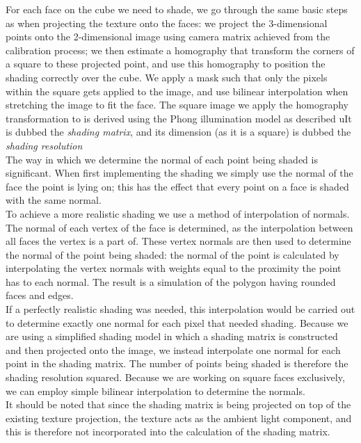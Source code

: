 For each face on the cube we need to shade, we go through the same basic steps as when projecting the texture onto the faces: we project the 3-dimensional points onto the 2-dimensional image using camera matrix achieved from the calibration process; we then estimate a homography that transform the corners of a square to these projected point, and use this homography to position the shading correctly over the cube. We apply a mask such that only the pixels within the square gets applied to the image, and use bilinear interpolation when stretching the image to fit the face. The square image we apply the homography transformation to is derived using the Phong illumination model as described uIt is dubbed the \textsl{shading matrix}, and its dimension (as it is a square) is dubbed the \textsl{shading resolution}\\
The way in which we determine the normal of each point being shaded is significant. When first implementing the shading we simply use the normal of the face the point is lying on; this has the effect that every point on a face is shaded with the same normal.\\
To achieve a more realistic shading we use a method of interpolation of normals. The normal of each vertex of the face is determined, as the interpolation between all faces the vertex is a part of. These vertex normals are then used to determine the normal of the point being shaded: the normal of the point is calculated by interpolating the vertex normals with weights equal to the proximity the point has to each normal. The result is a simulation of the polygon having rounded faces and edges.\\
If a perfectly realistic shading was needed, this interpolation would be carried out to determine exactly one normal for each pixel that needed shading. Because we are using a simplified shading model in which a shading matrix is constructed and then projected onto the image, we instead interpolate one normal for each point in the shading matrix. The number of points being shaded is therefore the shading resolution squared. Because we are working on square faces exclusively, we can employ simple bilinear interpolation to determine the normals.\\

It should be noted that since the shading matrix is being projected on top of the existing texture projection, the texture acts as the ambient light component, and this is therefore not incorporated into the calculation of the shading matrix. 
